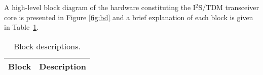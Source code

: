 
A high-level block diagram of the hardware constituting the I$^2$S/TDM
transceiver core is presented in Figure \ref{fig:bd} and a brief explanation of
each block is given in Table~\ref{tab:blocks}.
\clearpage



\begin{table}[H]
  \centering
    \begin{tabularx}{\textwidth}{ | c | X | }
    \hline
    \rowcolor{iob-green}
    {\bf Block} & {\bf Description} \\ \hline
    
    

    \end{tabularx}
  \caption{Block descriptions.}
  \label{tab:blocks}
\end{table}
